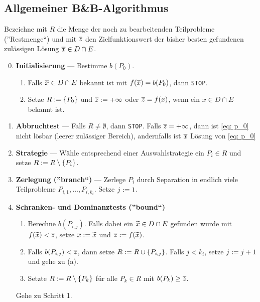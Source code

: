 \pagebreak

\subsection{Allgemeiner B\&B-Algorithmus}
Bezeichne mit $R$ die Menge der noch zu bearbeitenden Teilprobleme (''Restmenge``) und mit $\overline{z}$ den Zielfunktionswert der bisher besten gefundenen zulässigen Lösung $\overline{x} \in D \cap E$.

\begin{enumerate}[label=\underline{\textbf{Schritt \arabic*:}}, leftmargin=*]
	\setcounter{enumi}{-1}
	\item \textbf{Initialisierung} --- Bestimme $b(P_0)$.
	\begin{enumerate}[label=(\alph*), noitemsep]
		\item Falls $\overline{x} \in D \cap E$ bekannt ist mit $f(\overline{x}) = b(P_0)$, dann \texttt{STOP}.
		\item Setze $R \mathrel{:=} \left\{ P_0 \right\}$ und $\overline{z} \mathrel{:=} + \infty$ oder $\overline{z} = f(x)$, wenn ein $x \in D \cap E$ bekannt ist.
	\end{enumerate}	
	\item \textbf{Abbruchtest} --- Falls $R \neq \emptyset$, dann \texttt{STOP}. Falls $\overline{z} = +\infty$, dann ist \eqref{eq: p_0} nicht lösbar (leerer zulässiger Bereich), andernfalls ist $\overline{x}$ Lösung von \eqref{eq: p_0}
	\item \textbf{Strategie} --- Wähle entsprechend einer Auswahlstrategie ein $P_i \in R$ und setze $R \mathrel{:=} R \setminus \left\{ P_i \right\}$.
	\item \textbf{Zerlegung (''branch``)} --- Zerlege $P_i$ durch Separation in endlich viele Teilprobleme $P_{i,1}, \dots, P_{i,k_i}$. Setze $j \mathrel{:=} 1$.
	\item \textbf{Schranken- und Dominanztests (''bound``)}
	\begin{enumerate}[label=(\alph*), noitemsep]
		\item Berechne $b(P_{i,j})$. Falls dabei ein $\widetilde{x} \in D \cap E$ gefunden wurde mit $f(\widetilde{x}) < \overline{z}$, setze $\overline{x} \mathrel{:=} \widetilde{x}$ und $\overline{z} \mathrel{:=} f(\widetilde{x})$.
		\item Falls $b(P_{i,j}) < \overline{z}$, dann setze $R \mathrel{:=} R \cup \left\{ P_{i,j} \right\}$. Falls $j < k_i$, setze $j \mathrel{:=} j + 1$ und gehe zu (a).
		\item Setzte $R \mathrel{:=} R \setminus \left\{ P_k \right\}$ für alle $P_k \in R$ mit $b(P_k) \ge \overline{z}$. 
	\end{enumerate}	
	Gehe zu Schritt 1.
\end{enumerate}

